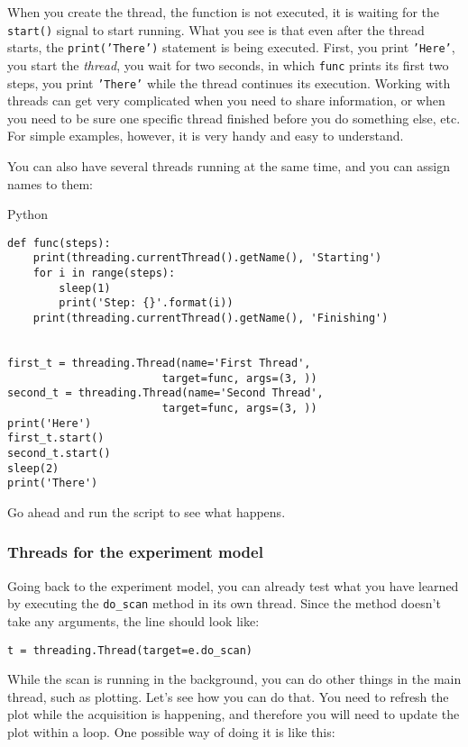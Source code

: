 When you create the thread, the function is not executed, it is waiting
for the \texttt{start()} signal to start running. What you see is that
even after the thread starts, the
\texttt{print('There')} statement is
being executed. First, you print
\texttt{'Here'}, you start the
\emph{thread}, you wait for two seconds, in which \texttt{func} prints
its first two steps, you print
\texttt{'There'} while the thread
continues its execution. Working with threads can get very complicated
when you need to share information, or when you need to be sure one
specific thread finished before you do something else, etc. For simple
examples, however, it is very handy and easy to understand.

You can also have several threads running at the same time, and you can
assign names to them:

Python

\begin{verbatim}
def func(steps):
    print(threading.currentThread().getName(), 'Starting')
    for i in range(steps):
        sleep(1)
        print('Step: {}'.format(i))
    print(threading.currentThread().getName(), 'Finishing')


first_t = threading.Thread(name='First Thread', 
                        target=func, args=(3, ))
second_t = threading.Thread(name='Second Thread', 
                        target=func, args=(3, ))
print('Here')
first_t.start()
second_t.start()
sleep(2)
print('There')
\end{verbatim}

Go ahead and run the script to see what happens.

\subsubsection{Threads for the experiment model}\label{threads-for-the-experimentmodel}

Going back to the experiment model, you can already test what you have
learned by executing the \texttt{do_scan} method in its own thread.
Since the method doesn't take any arguments, the line should look like:

\begin{verbatim}
t = threading.Thread(target=e.do_scan)
\end{verbatim}

While the scan is running in the background, you can do other things in
the main thread, such as plotting. Let's see how you can do that. You
need to refresh the plot while the acquisition is happening, and
therefore you will need to update the plot within a loop. One possible
way of doing it is like this:

